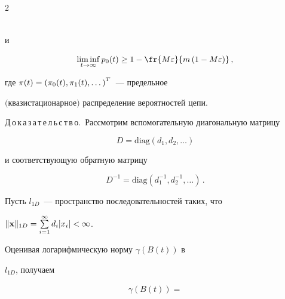 \begin{multicols}{2}
{\begin{multline}
\label{n00045}


\end{multline}


и


\begin{equation}


\liminf_{t \to \infty} p_0(t) \ge 1 -


 \fr{M\varepsilon}{m\left(1-M\varepsilon\right)}\,,


\label{n00048}


\end{equation}


где  ${\bf\pi}(t) = \left(\pi_0(t), \pi_1(t), \dots \right)^T$~--- предельное


$($квазистационарное$)$ распределение вероятностей цепи.}





\noindent


Д\,о\,к\,а\,з\,а\,т\,е\,л\,ь\,с\,т\,в\,о.~Рассмотрим вспомогательную диагональную матрицу


\begin{equation*}


 D=\mathrm{diag}\left (d_{1},d_{2},\ldots \right )




\end{equation*}


и соответствующую обратную матрицу


\begin{equation*}


 D^{-1}=\mathrm{diag}\left ( d^{-1}_{1},d^{-1}_{2},\ldots \right )\,.




\end{equation*}





Пусть $l_{1D}$~--- пространство последовательностей таких, что


$\|{\bf x}\|_{1D}=\sum\limits_{i=1}^{\infty}d_{i}|x_{i}|<\infty$.





Оценивая логарифмическую норму  $\gamma \left(B(t)\right)$ в


$l_{1D}$, получаем


\begin{multline*}


\gamma \left(B(t)\right) ={}\\



\end{multline*}
\end{multicols}
